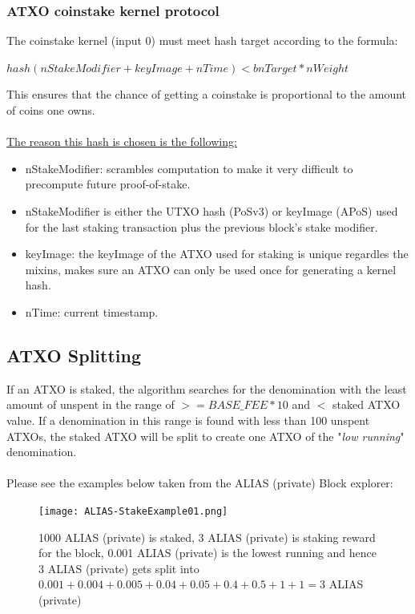 \subsubsection{ATXO coinstake kernel protocol}
The coinstake kernel (input 0) must meet hash target according to the formula:



\vspace{5mm} %
$ hash(nStakeModifier + keyImage + nTime) < bnTarget * nWeight  $
\vspace{5mm} %

\noindent
This ensures that the chance of getting a coinstake is proportional to
the amount of coins one owns.
\\
\\
\noindent
\underline{The reason this hash is chosen is the following:}
\begin{itemize}
	\item nStakeModifier: scrambles computation to make it very difficult
	to precompute future proof-of-stake.
	\item nStakeModifier is either the UTXO hash (PoSv3) or keyImage (APoS) 
	used for the last staking transaction plus the previous block's stake 
	modifier.
	\item keyImage: the keyImage of the ATXO used for staking is unique 
	regardles the mixins, makes sure an ATXO can only be used once for 
	generating a kernel hash.
	\item nTime: current timestamp.
\end{itemize}



\subsection{ATXO Splitting}
If an ATXO is staked, the algorithm searches for the denomination with the
least amount of unspent in the range of  $>= BASE\_FEE * 10$ and $<$ staked
ATXO value. If a denomination in this range is found with less than 100
unspent ATXOs, the staked ATXO will be split to create one ATXO of the
"\textit{low running}" denomination.
\\
\\
\noindent
Please see the examples below taken from the ALIAS (private) Block explorer:

\begin{figure}[ht]
	
	\centering
	\texttt{[image: ALIAS-StakeExample01.png]}
	\caption{1000 ALIAS (private) is staked, 3 ALIAS (private) is staking reward for the 
	block, 0.001 ALIAS (private) is the lowest running and hence 3 ALIAS (private) gets 
	split into $0.001 + 0.004 + 0.005 + 0.04 + 0.05 + 0.4 + 0.5 + 1 + 1 = 3$ ALIAS (private)}
\end{figure}
\newpage




